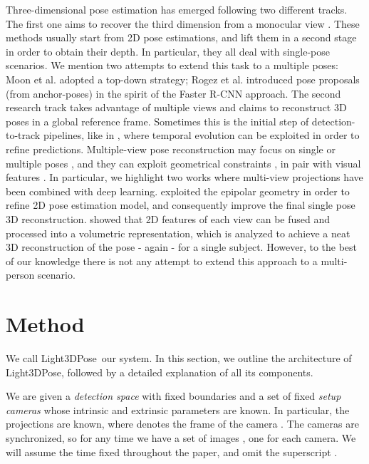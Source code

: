\documentclass[a4paper,conference]{IEEEtran}
\newcommand{\thename}{Light3DPose}
\begin{document}
Three-dimensional pose estimation has emerged following two different tracks. The first one aims to recover the third dimension from a monocular view \cite{tome2017lifting, pavllo20193d, yang20183d, sun2018integral, nibali20193d, kanazawa2019learning, habibie2019wild}. These methods usually start from 2D pose estimations, and lift them in a second stage in order to obtain their depth. In particular, they all deal with single-pose scenarios. We mention two attempts to extend this task to a multiple poses: Moon et al. \cite{moon2019camera} adopted a top-down strategy; Rogez et al. \cite{rogez2019lcr} introduced pose proposals (from anchor-poses) in the spirit of the Faster R-CNN approach. The second research track takes advantage of multiple views and claims to reconstruct 3D poses in a global reference frame. Sometimes this is the initial step of detection-to-track pipelines, like in \cite{bridgeman2019multi, ohashi2020synergetic}, where temporal evolution can be exploited in order to refine predictions. Multiple-view pose reconstruction  may focus on single \cite{martinez2017simple, pavlakos2017harvesting, tome2018rethinking, qiu2019cross, iskakov2019learnable} or multiple poses \cite{pirinen2019domes}, and they can exploit geometrical constraints \cite{belagiannis20143d, tanke2019iterative}, in pair with visual features \cite{dong2019fast}. In particular, we highlight two works where multi-view projections have been combined with deep learning. \cite{qiu2019cross} exploited the epipolar geometry in order to refine 2D pose estimation model, and consequently improve the final single pose 3D reconstruction. \cite{iskakov2019learnable}  showed that 2D features of each view can be fused and processed into a volumetric representation, which is analyzed to achieve a neat 3D reconstruction of the pose - again - for a single subject. However, to the best of our knowledge there is not any attempt to extend this approach to a multi-person scenario.

\section{Method}\label{sec:method}

We call \thename\ our system.
In this section, we outline the architecture of \thename,
followed by a detailed explanation of all its components.

We are given a \emph{detection space}  with fixed boundaries
and a set of fixed \emph{setup cameras}
 whose intrinsic and extrinsic parameters
are known. In particular, the projections  are known,
where  denotes the frame of the camera .
The cameras are synchronized, so for any time  we have a set of images
, one for each camera. We will assume the time
fixed throughout the paper, and omit the superscript .
\end{document}
